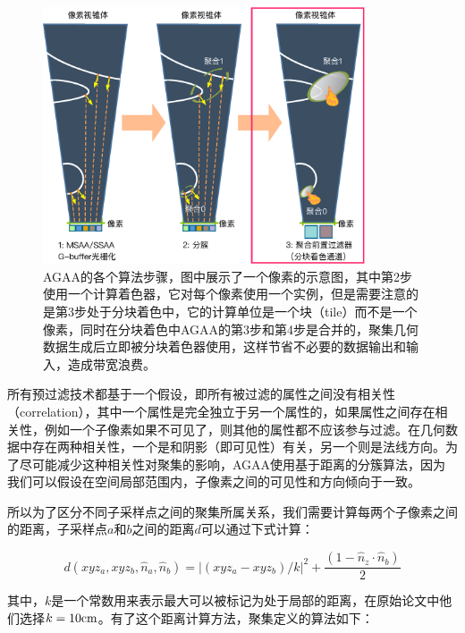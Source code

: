 \begin{figure}
\begin{center}
	\includegraphics[width=0.85\textwidth]{figures/shade/agaa-1}
\end{center}
	\caption{AGAA的各个算法步骤，图中展示了一个像素的示意图，其中第2步使用一个计算着色器，它对每个像素使用一个实例，但是需要注意的是第3步处于分块着色中，它的计算单位是一个块（tile）而不是一个像素，同时在分块着色中AGAA的第3步和第4步是合并的，聚集几何数据生成后立即被分块着色器使用，这样节省不必要的数据输出和输入，造成带宽浪费。}
	\label{f:shade-agss-1}
\end{figure}

所有预过滤技术都基于一个假设，即所有被过滤的属性之间没有相关性（correlation），其中一个属性是完全独立于另一个属性的，如果属性之间存在相关性，例如一个子像素如果不可见了，则其他的属性都不应该参与过滤。在几何数据中存在两种相关性，一个是和阴影（即可见性）有关，另一个则是法线方向。为了尽可能减少这种相关性对聚集的影响，AGAA使用基于距离的分簇算法，因为我们可以假设在空间局部范围内，子像素之间的可见性和方向倾向于一致。

所以为了区分不同子采样点之间的聚集所属关系，我们需要计算每两个子像素之间的距离，子采样点$a$和$b$之间的距离$d$可以通过下式计算：

\begin{equation}
	d(xyz_a,xyz_b,\hat{n}_a,\hat{n}_b)=|(xyz_a-xyz_b)/k|^{2}+\frac{(1-\hat{n}_z\cdot\hat{n}_b)}{2}
\end{equation}

其中，$k$是一个常数用来表示最大可以被标记为处于局部的距离，在原始论文中他们选择$k=10{\rm cm}$。有了这个距离计算方法，聚集定义的算法如下：

